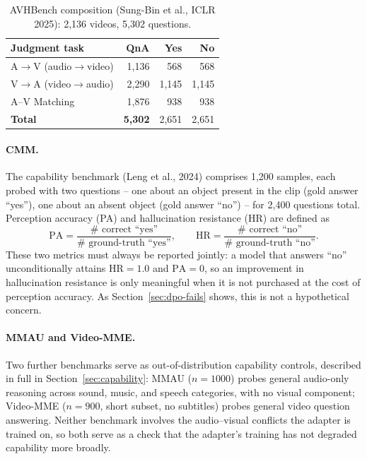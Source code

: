 \documentclass[11pt,a4paper,oneside]{article}
\begin{document}
\begin{table}[h]
\centering
\small
\begin{tabular}{lrrr}
\toprule
Judgment task & QnA & Yes & No \\
\midrule
A$\to$V (audio$\to$video) & 1,136 & 568 & 568 \\
V$\to$A (video$\to$audio) & 2,290 & 1,145 & 1,145 \\
A--V Matching             & 1,876 & 938 & 938 \\
\midrule
\textbf{Total}            & \textbf{5,302} & 2,651 & 2,651 \\
\bottomrule
\end{tabular}
\caption{AVHBench composition (Sung-Bin et al., ICLR 2025): 2,136 videos, 5,302 questions.}
\label{tab:avhbench}
\end{table}

\paragraph{CMM.} The capability benchmark (Leng et al., 2024) comprises 1,200 samples, each probed
with two questions -- one about an object present in the clip (gold answer ``yes''), one about an
absent object (gold answer ``no'') -- for 2,400 questions total. Perception accuracy (PA) and
hallucination resistance (HR) are defined as
\[
\mathrm{PA} = \frac{\#\text{ correct ``yes''}}{\#\text{ ground-truth ``yes''}}, \qquad
\mathrm{HR} = \frac{\#\text{ correct ``no''}}{\#\text{ ground-truth ``no''}}.
\]
These two metrics must always be reported jointly: a model that answers ``no'' unconditionally
attains $\mathrm{HR}=1.0$ and $\mathrm{PA}=0$, so an improvement in hallucination resistance is
only meaningful when it is not purchased at the cost of perception accuracy. As
Section~\ref{sec:dpo-fails} shows, this is not a hypothetical concern.

\paragraph{MMAU and Video-MME.} Two further benchmarks serve as out-of-distribution capability
controls, described in full in Section~\ref{sec:capability}: MMAU ($n=1000$) probes general
audio-only reasoning across sound, music, and speech categories, with no visual component; Video-MME
($n=900$, short subset, no subtitles) probes general video question answering. Neither benchmark
involves the audio--visual conflicts the adapter is trained on, so both serve as a check that the
adapter's training has not degraded capability more broadly.
\end{document}
